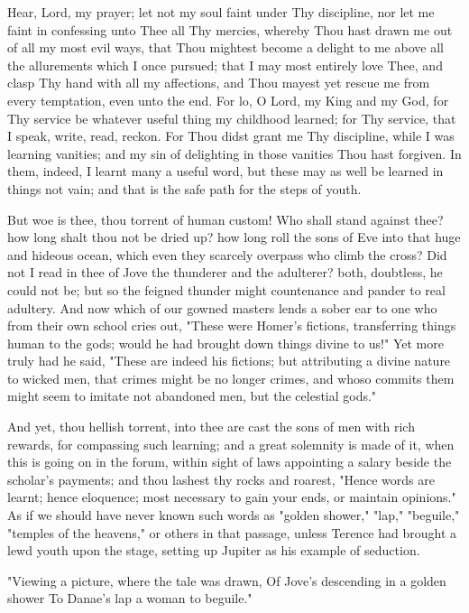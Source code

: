 \documentclass[b5paper,openright,12pt,twoside]{book}
\begin{document}
Hear, Lord, my prayer; let not my soul faint under Thy discipline, nor
let me faint in confessing unto Thee all Thy mercies, whereby Thou
hast drawn me out of all my most evil ways, that Thou mightest become a
delight to me above all the allurements which I once pursued; that I may
most entirely love Thee, and clasp Thy hand with all my affections, and
Thou mayest yet rescue me from every temptation, even unto the end. For
lo, O Lord, my King and my God, for Thy service be whatever useful
thing my childhood learned; for Thy service, that I speak, write, read,
reckon. For Thou didst grant me Thy discipline, while I was learning
vanities; and my sin of delighting in those vanities Thou hast forgiven.
In them, indeed, I learnt many a useful word, but these may as well be
learned in things not vain; and that is the safe path for the steps of
youth.

But woe is thee, thou torrent of human custom! Who shall stand against
thee? how long shalt thou not be dried up? how long roll the sons of Eve
into that huge and hideous ocean, which even they scarcely overpass who
climb the cross? Did not I read in thee of Jove the thunderer and the
adulterer? both, doubtless, he could not be; but so the feigned thunder
might countenance and pander to real adultery. And now which of our
gowned masters lends a sober ear to one who from their own school cries
out, "These were Homer's fictions, transferring things human to the
gods; would he had brought down things divine to us!" Yet more truly had
he said, "These are indeed his fictions; but attributing a divine nature
to wicked men, that crimes might be no longer crimes, and whoso commits
them might seem to imitate not abandoned men, but the celestial gods."

And yet, thou hellish torrent, into thee are cast the sons of men with
rich rewards, for compassing such learning; and a great solemnity is
made of it, when this is going on in the forum, within sight of laws
appointing a salary beside the scholar's payments; and thou lashest
thy rocks and roarest, "Hence words are learnt; hence eloquence; most
necessary to gain your ends, or maintain opinions." As if we should have
never known such words as "golden shower," "lap," "beguile," "temples
of the heavens," or others in that passage, unless Terence had brought
a lewd youth upon the stage, setting up Jupiter as his example of
seduction.

         "Viewing a picture, where the tale was drawn,
         Of Jove's descending in a golden shower
         To Danae's lap a woman to beguile."
\end{document}
